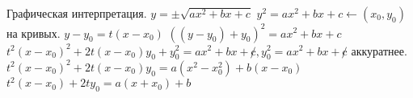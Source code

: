 \documentclass[12pt]{article}
\begin{document}
    Графическая интерпретация. \newline
    $y = \pm\sqrt{ax^2 + bx + c}$ \newline
    $y^2 = ax^2 + bx + c \leftarrow (x_0, y_0)$ на кривых. \newline
    $y - y_0 = t(x - x_0)$ \newline
    $((y - y_0) + y_0)^2 = ax^2 + bx + c$ \newline
    $t^2(x - x_0)^2 + 2t(x - x_0)y_0 + y_0^2 = ax^2 + bx + \not c, y_0^2 = ax^2 + bx + \not c$ аккуратнее. \newline
    $t^2(x - x_0)^2 + 2t(x - x_0)y_0 = a(x^2 - x_0^2) + b(x - x_0)$ \newline
    $t^2(x - x_0) + 2ty_0 = a(x + x_0) + b$ \newline
\end{document}
